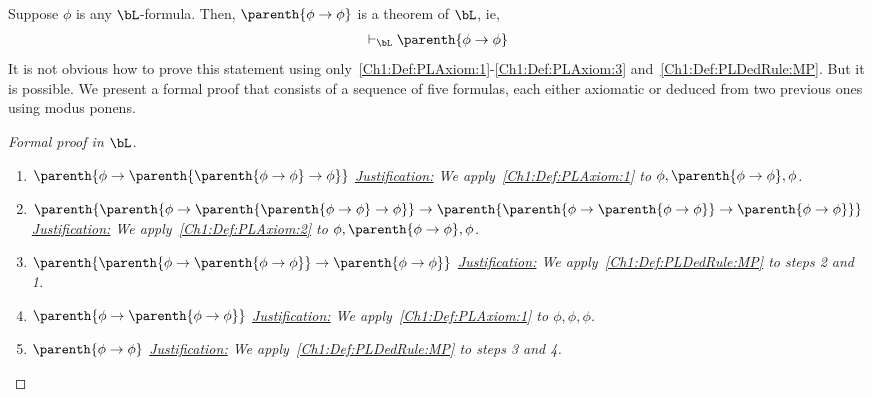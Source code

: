 \begin{boxexample}\label{Ch1:Eg:Self_implies_self}
    Suppose $\phi$ is any $\bL$-formula. Then, $\parenth{\phi \to \phi}$ is a theorem of $\bL$, ie,
    \begin{align}
        \vdash_{\bL} \parenth{\phi \to \phi}
        \label{Ch1:Eq:Self_implies_self}
    \end{align}
    It is not obvious how to prove this statement using only~\ref{Ch1:Def:PLAxiom:1}-\ref{Ch1:Def:PLAxiom:3} and~\ref{Ch1:Def:PLDedRule:MP}. But it is possible. We present a formal proof that consists of a sequence of five formulas, each either axiomatic or deduced from two previous ones using modus ponens.
    \begin{proof}[Formal proof in $\bL$]\hfill
        \begin{enumerate}
            \item $\parenth{\phi \to \parenth{\parenth{\phi \to \phi} \to \phi}}$
            \newline
            \textit{\underline{Justification:}
                We apply~\ref{Ch1:Def:PLAxiom:1} to $\phi, \parenth{\phi \to \phi}, \phi$.
            }

            \item $\parenth{\parenth{\phi \to \parenth{\parenth{\phi \to \phi} \to \phi}} \to \parenth{\parenth{\phi \to \parenth{\phi \to \phi}} \to \parenth{\phi \to \phi}}}$
            \newline
            \textit{\underline{Justification:}
                We apply~\ref{Ch1:Def:PLAxiom:2} to $\phi, \parenth{\phi \to \phi}, \phi$.
            }

            \item $\parenth{\parenth{\phi \to \parenth{\phi \to \phi}} \to \parenth{\phi \to \phi}}$
            \newline
            \textit{\underline{Justification:}
            We apply~\ref{Ch1:Def:PLDedRule:MP} to steps 2 and 1. %
            }

            \item $\parenth{\phi \to \parenth{\phi \to \phi}}$
            \newline
            \textit{\underline{Justification:}
                We apply~\ref{Ch1:Def:PLAxiom:1} to $\phi, \phi, \phi$.
            }

            \item $\parenth{\phi \to \phi}$
            \newline
            \textit{\underline{Justification:}
                We apply~\ref{Ch1:Def:PLDedRule:MP} to steps 3 and 4.
            }
        \end{enumerate}
    \end{proof}
\end{boxexample}

